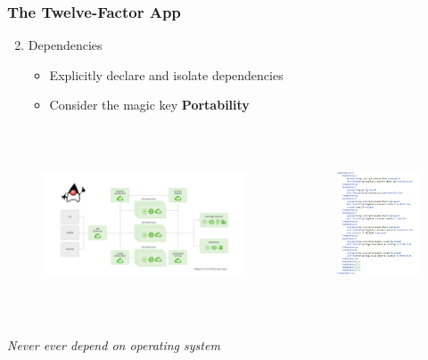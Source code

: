 \documentclass{beamer}
\begin{document}
	\begin{frame}
		\frametitle{The Twelve-Factor App}
		\begin{enumerate}
			\setcounter{enumi}{1}
			\item Dependencies
			\begin{itemize}
				\item Explicitly declare and isolate dependencies
				\item Consider the magic key \textbf {Portability}
			\end{itemize}
		\end{enumerate}
		
		\begin{columns}[c]
				\begin{figure}[h]
					\centering
					\includegraphics[width=1\linewidth, height=50mm, scale=1]{img/dpnc1.png}
				\end{figure}
				\begin{figure}[h]
					\centering
					\includegraphics[width=1\linewidth, height=50mm, scale=1]{img/dpnc2.png}
				\end{figure}
			\end{columns}
		
		\vspace{4mm}
		\hspace{5mm} \textit {\color{red} Never ever depend on operating system}
		\vspace{26mm}
	\end{frame}
	
\end{document}
